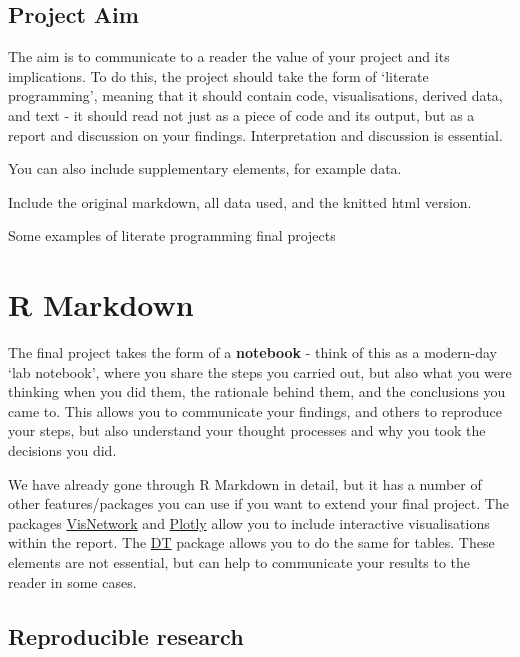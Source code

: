 \documentclass[
]{book}
\begin{document}
\hypertarget{project-aim}{%
\subsection{Project Aim}\label{project-aim}}

The aim is to communicate to a reader the value of your project and its implications. To do this, the project should take the form of `literate programming', meaning that it should contain code, visualisations, derived data, and text - it should read not just as a piece of code and its output, but as a report and discussion on your findings. Interpretation and discussion is essential.

You can also include supplementary elements, for example data.

Include the original markdown, all data used, and the knitted html version.

Some examples of literate programming final projects

\hypertarget{r-markdown}{%
\section{R Markdown}\label{r-markdown}}

The final project takes the form of a \textbf{notebook} - think of this as a modern-day `lab notebook', where you share the steps you carried out, but also what you were thinking when you did them, the rationale behind them, and the conclusions you came to. This allows you to communicate your findings, and others to reproduce your steps, but also understand your thought processes and why you took the decisions you did.

We have already gone through R Markdown in detail, but it has a number of other features/packages you can use if you want to extend your final project. The packages \href{https://datastorm-open.github.io/visNetwork/}{VisNetwork} and \href{https://plotly.com/r/}{Plotly} allow you to include interactive visualisations within the report. The \href{https://rstudio.github.io/DT/}{DT} package allows you to do the same for tables. These elements are not essential, but can help to communicate your results to the reader in some cases.

\hypertarget{reproducible-research}{%
\subsection{Reproducible research}\label{reproducible-research}}
\end{document}
